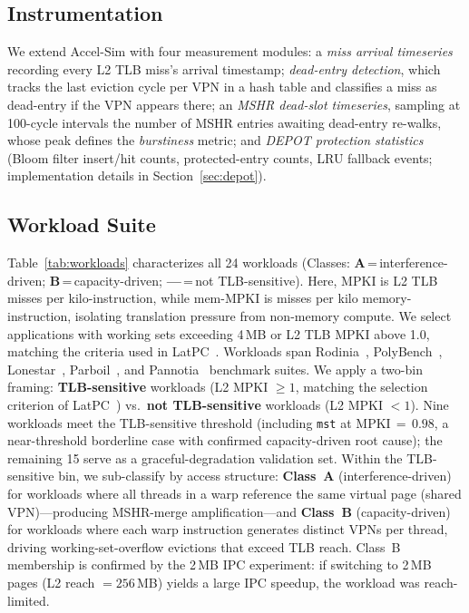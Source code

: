 \subsection{Instrumentation}

We extend Accel-Sim with four measurement modules: a \emph{miss arrival timeseries}
recording every L2 TLB miss's arrival timestamp; \emph{dead-entry detection}, which
tracks the last eviction cycle per VPN in a hash table and classifies a miss as
dead-entry if the VPN appears there; an \emph{MSHR dead-slot timeseries}, sampling at
100-cycle intervals the number of MSHR entries awaiting dead-entry re-walks, whose peak
defines the \emph{burstiness} metric; and \emph{DEPOT protection statistics} (Bloom
filter insert/hit counts, protected-entry counts, LRU fallback events; implementation
details in Section~\ref{sec:depot}).

\subsection{Workload Suite}
Table~\ref{tab:workloads} characterizes all 24 workloads
(Classes: \textbf{A}\,=\,interference-driven; \textbf{B}\,=\,capacity-driven; \textbf{---}\,=\,not TLB-sensitive). Here, MPKI is L2 TLB misses per kilo-instruction, while mem-MPKI is misses per
kilo memory-instruction, isolating translation pressure from non-memory compute.
We select applications with working sets exceeding 4\,MB or L2 TLB MPKI above 1.0,
matching the criteria used in LatPC~\cite{latpc}.
Workloads span Rodinia~\cite{rodinia}, PolyBench~\cite{polybench}, Lonestar~\cite{lonestar},
Parboil~\cite{parboil}, and Pannotia~\cite{pannotia} benchmark suites.
We apply a two-bin framing: \textbf{TLB-sensitive} workloads (L2 MPKI $\geq 1$, matching the
selection criterion of LatPC~\cite{latpc}) vs.\ \textbf{not TLB-sensitive} workloads
(L2 MPKI $< 1$).
Nine workloads meet the TLB-sensitive threshold (including \texttt{mst} at MPKI$\,{=}\,0.98$,
a near-threshold borderline case with confirmed capacity-driven root cause);
the remaining 15 serve as a graceful-degradation validation set.
Within the TLB-sensitive bin, we sub-classify by access structure:
\textbf{Class~A} (interference-driven) for workloads where all threads in a warp
reference the same virtual page (shared VPN)---producing MSHR-merge amplification---and
\textbf{Class~B} (capacity-driven) for workloads where each warp instruction generates
distinct VPNs per thread, driving working-set-overflow evictions that exceed TLB reach.
Class~B membership is confirmed by the 2\,MB IPC experiment: if switching to 2\,MB pages
(L2 reach $= 256$\,MB) yields a large IPC speedup, the workload was reach-limited.


